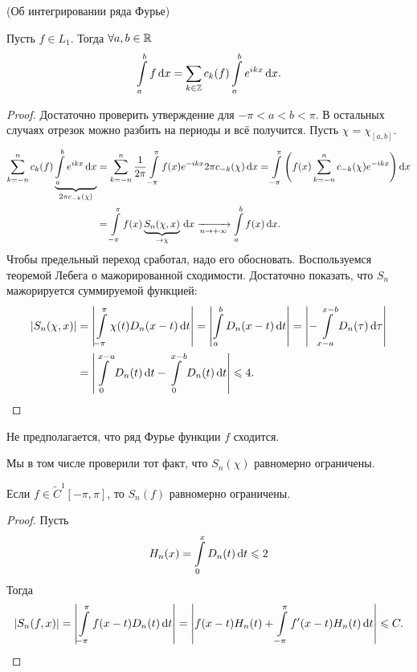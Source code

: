 \begin{theorem}(Об интегрировании ряда Фурье)

    Пусть $f \in L_1$. Тогда $\forall a, b \in \R$
    \[
        \intl_a^b{f \dd x} = \sum_{k \in \bZ}{c_k(f) \intl_a^b{e^{ikx} \dd x}}
    .\]
\end{theorem}
\begin{proof}
    Достаточно проверить утверждение для $-\pi < a < b < \pi$. В остальных случаях
    отрезок можно разбить на периоды и всё получится. Пусть $\chi = \chi_{[a, b]}$.
    \begin{align*}
        \sum_{k = -n}^n{c_k(f) \underbrace{\intl_a^b{e^{ikx} \dd x}}_{2 \pi 
            c_{-k}(\chi)}} 
        &= \sum_{k = -n}^n{\frac{1}{2\pi} 
            \intl_{-\pi}^\pi{f(x) e^{-ikx}
                2 \pi c_{-k}(\chi) \dd x}} = \intl_{-\pi}^\pi{\parens*{f(x) 
        \sum_{k = -n}^n{c_{-k}(\chi) e^{-ikx}}} \dd x} \\
        &= \intl_{-\pi}^\pi{f(x) \underbrace{S_n(\chi, x)}_{\to \chi} \dd x} 
        \xrightarrow[n \to +\infty]{} \intl_a^b{f(x) \dd x}
    .\end{align*}
    Чтобы предельный переход сработал, надо его обосновать. Воспользуемся
    теоремой Лебега о мажорированной сходимости. Достаточно показать,
    что $S_n$ мажорируется суммируемой функцией:
    \begin{align*}
        |S_n(\chi, x)| 
        &= \abs*{\intl_{-\pi}^\pi{\chi(t) D_n(x - t) \dd t}} =
        \abs*{\intl_a^b{D_n(x - t) \dd t}} = \abs*{-\intl_{x - a}^{x - b}{
        D_n(\tau) \dd \tau}} \\
        &= \abs*{\intl_0^{x - a}{D_n(t) \dd t} -
        \intl_0^{x - b}{D_n(t) \dd t}} \leqslant 4
    .\end{align*}
\end{proof}

\begin{remark}
    Не предполагается, что ряд Фурье функции $f$ сходится.
\end{remark}

\begin{remark}
    Мы в том числе проверили тот факт, что $S_n(\chi)$ равномерно ограничены.
\end{remark}

\begin{remark}
    Если $f \in \widetilde{C}^1[-\pi, \pi]$, то $S_n(f)$ равномерно ограничены.
\end{remark}
\begin{proof}
    Пусть
    \[
        H_n(x) = \intl_0^x{D_n(t) \dd t} \leqslant 2
    \]
    Тогда
    \begin{align*}
        |S_n(f, x)| = \abs*{\intl_{-\pi}^\pi{f(x - t) D_n(t) \dd t}} =
        \abs*{f(x - t) H_n(t) + \intl_{-\pi}^\pi{f'(x - t) H_n(t) \dd t}}
        \leqslant C
    .\end{align*} 
\end{proof}

